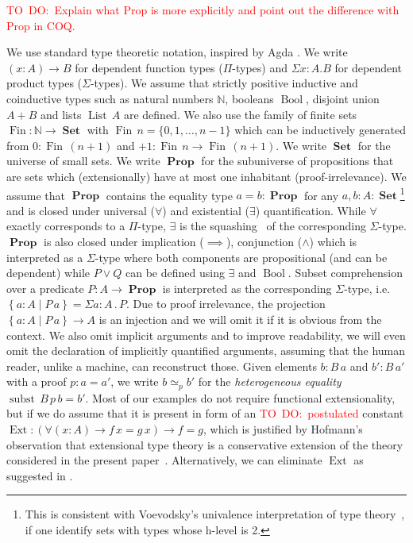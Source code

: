 \documentclass[envcountsame]{llncs}
\newcommand{\todo}[1]{\textcolor{red}{TO~DO:~#1}}
\newcommand{\amend}[2][]{\textcolor{blue}{#2}}
\newcommand{\N}{\mathbb{N}}
\newcommand{\dotop}{\mathrel{.}}
\providecommand{\set}  [1]{\left\{#1\right\}}
\DeclareMathOperator{\Prop}{\mathbf{Prop}}
\DeclareMathOperator{\Set}{\mathbf{Set}}
\DeclareMathOperator{\Ext}{Ext}
\DeclareMathOperator{\Bool}{Bool}
\DeclareMathOperator{\subst}{subst}
\DeclareMathOperator{\List}{List}
\DeclareMathOperator{\Fin}{Fin}
\renewcommand{\equiv}{=}
\begin{document}
\todo{Explain what Prop is more explicitly and point out the difference with Prop in COQ.}


We use standard type theoretic notation, inspired by Agda
\cite{norell-phd}. We write $(x : A) \to B$ for dependent function
types ($\Pi$-types) and $\Sigma x:A.B$ for dependent product types
($\Sigma$-types). We assume that strictly positive inductive and
coinductive types such as natural numbers $\N$, booleans $\Bool$,
disjoint union $A + B$ and lists $\List\,A$ are defined. We also use
the family of finite sets $\Fin : \N \to \Set$ with $\Fin\,n = \{ 0 ,
1, \dots, n-1\}$ which can be inductively generated from $0 :
\Fin\,(n+1)$ and $+1 : \Fin\,n \to \Fin\,(n+1) $. We write $\Set$ for
the universe of small sets.%
We
write $\Prop$ for the subuniverse of propositions that are sets which
(extensionally) have at most one inhabitant (proof-irrelevance). We assume that $\Prop$
contains the equality type $a = b : \Prop$ for any $a,b : A : \Set$\footnote{This is consistent with Voevodsky's univalence interpretation of type theory~\cite{voevodsky}, if one identify sets with types whose h-level is 2.}  
and is closed under
universal ($\forall$) and existential ($\exists$)
quantification. While $\forall$ exactly corresponds to a $\Pi$-type,
$\exists$ is the squashing~\cite{mendler1990quotient} of the
corresponding $\Sigma$-type.  $\Prop$ is also closed under implication ($\implies$), conjunction
($\wedge$) which is interpreted as a $\Sigma$-type where both components
are propositional (and can be dependent) while $P \vee Q$ can be
defined using $\exists$ and $\Bool$.  Subset comprehension over a
predicate $P : A \to \Prop$  is interpreted as the corresponding $\Sigma$-type,
i.e. $\set{a:A\mid P\,a}=\Sigma a:A \dotop P$. Due to proof
irrelevance, the projection $\set{a:A\mid P\,a} \to A$ is an injection
and we will omit it if it is obvious from the context. We also omit
implicit arguments and to improve readability, we will even omit the
declaration of implicitly quantified arguments, assuming that the
human reader, unlike a machine, can reconstruct those. Given elements $b : B\,a$ and $b' : B\,a'$ with a proof $p : a = a'$,
we write $b \simeq_{p} b'$ for  the \emph{heterogeneous equality} $\subst\,B\,p\,b \equiv b'$. Most of
our examples do not require functional extensionality, but if we do assume that it is present in form of an \amend[uninterpreted]{\todo{postulated}} constant $\Ext : (\forall(x : A) \to f\,x = g\,x) \to f = g$,
which is justified by Hofmann's observation that extensional type
theory is a conservative extension of the theory considered in the present paper~\cite{hofmann1995thesis}. Alternatively, we can eliminate $\Ext$ as suggested in
\cite{alti:lics99}. 
\end{document}
